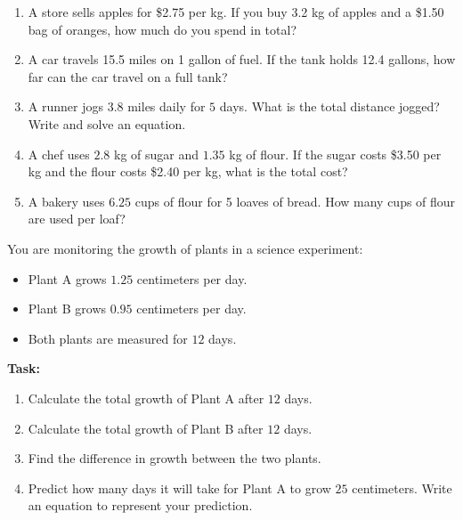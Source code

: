 \documentclass[12pt]{article}
\begin{document}
\begin{tcolorbox}[colframe=black!60, colback=white, 
coltitle=black, colbacktitle=black!15, fonttitle=\bfseries\Large, 
title=Problems, halign title=center, left=10pt, right=10pt, top=10pt, bottom=100pt]
\begin{enumerate}[start=9, itemsep=7em]
    \item A store sells apples for \$2.75 per kg. If you buy 3.2 kg of apples and a \$1.50 bag of oranges, how much do you spend in total?
    \item A car travels 15.5 miles on 1 gallon of fuel. If the tank holds 12.4 gallons, how far can the car travel on a full tank?
    \item A runner jogs \( 3.8 \) miles daily for \( 5 \) days. What is the total distance jogged? Write and solve an equation.
    \item A chef uses \( 2.8 \) kg of sugar and \( 1.35 \) kg of flour. If the sugar costs \$3.50 per kg and the flour costs \$2.40 per kg, what is the total cost?
    \item A bakery uses \( 6.25 \) cups of flour for 5 loaves of bread. How many cups of flour are used per loaf?
\end{enumerate}
\end{tcolorbox}

\vspace{1em}

\begin{tcolorbox}[colframe=black!60, colback=white, 
coltitle=black, colbacktitle=black!15, fonttitle=\bfseries\Large, 
title=Performance Task: Monitoring Plant Growth, halign title=center, left=10pt, right=10pt, top=10pt, bottom=50pt]
You are monitoring the growth of plants in a science experiment:
\begin{itemize}
    \item Plant A grows \( 1.25 \) centimeters per day.
    \item Plant B grows \( 0.95 \) centimeters per day.
    \item Both plants are measured for \( 12 \) days.
\end{itemize}
\textbf{Task:}
\begin{enumerate}[itemsep=3em]
    \item Calculate the total growth of Plant A after \( 12 \) days.
    \item Calculate the total growth of Plant B after \( 12 \) days.
    \item Find the difference in growth between the two plants.
    \item Predict how many days it will take for Plant A to grow \( 25 \) centimeters. Write an equation to represent your prediction.
    \vspace{1cm}
\end{enumerate}
\end{tcolorbox}
\end{document}
